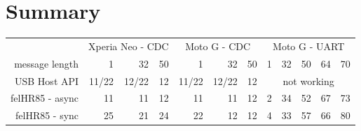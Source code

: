 
\clearpage

\section{Summary}

\begin{center}
\begin{tabular}{r|r|r|r|r|r|r|r|r|r|r|r}
& \multicolumn{3}{c|}{Xperia Neo - CDC} & \multicolumn{3}{c|}{Moto G - CDC} &
\multicolumn{5}{c}{Moto G - UART} \\
message length & 1 & 32 & \hspace{3ex}50 & 
1 & 32 & \hspace{3ex}50 & \hspace{1ex}1 & 
32 & 50 & 64 & 70
\\
\hline
USB Host API & 
11/22 & 12/22 & 12 & 11/22 & 12/22 & 12 &
\multicolumn{5}{c}{\cellcolor{red!50}not working}
\\
felHR85 - async & 
11 & 11 & 12 & 11 & 11 & 12 & 2 & 34 & 52 & 67 & 73 \\
felHR85 - sync & 
25 & 21 & 24 & 22 & 12 & 12 &
4 & 33 & \cellcolor{yellow!50}57 & 66 & \cellcolor{yellow!50}80
\end{tabular}
\end{center}